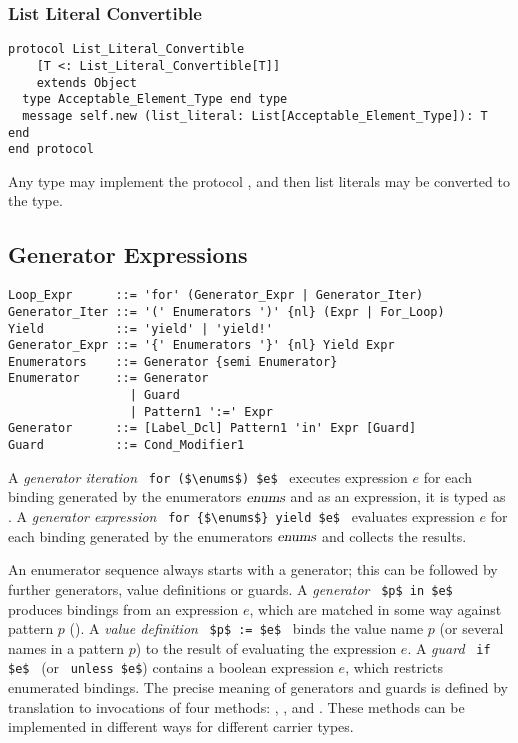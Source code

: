 \subsubsection{List Literal Convertible}

\begin{lstlisting}
protocol List_Literal_Convertible 
    [T <: List_Literal_Convertible[T]] 
    extends Object
  type Acceptable_Element_Type end type
  message self.new (list_literal: List[Acceptable_Element_Type]): T end
end protocol
\end{lstlisting}

Any type may implement the protocol , and then list literals may be converted to the type. 





\subsection{Generator Expressions}
\label{sec:generator-expressions}

\syntax\begin{lstlisting}
Loop_Expr      ::= 'for' (Generator_Expr | Generator_Iter)
Generator_Iter ::= '(' Enumerators ')' {nl} (Expr | For_Loop)
Yield          ::= 'yield' | 'yield!'
Generator_Expr ::= '{' Enumerators '}' {nl} Yield Expr
Enumerators    ::= Generator {semi Enumerator}
Enumerator     ::= Generator
                 | Guard
                 | Pattern1 ':=' Expr
Generator      ::= [Label_Dcl] Pattern1 'in' Expr [Guard]
Guard          ::= Cond_Modifier1
\end{lstlisting}

A {\em generator iteration} ~\lstinline!for ($\enums$) $e$!~ executes expression $e$ for each binding generated by the enumerators $\mbox{\sl enums}$ and as an expression, it is typed as . A {\em generator expression} ~\lstinline!for {$\enums$} yield $e$!~ evaluates expression $e$ for each binding generated by the enumerators $\mbox{\sl enums}$ and collects the results.

An enumerator sequence always starts with a generator; this can be followed by further generators, value definitions or guards. A {\em generator} ~\lstinline!$p$ in $e$!~ produces bindings from an expression $e$, which are matched in some way against pattern $p$ (). A {\em value definition} ~\lstinline!$p$ := $e$!~ binds the value name $p$ (or several names in a pattern $p$) to the result of evaluating the expression $e$. A {\em guard} ~\lstinline!if $e$!~ (or ~\lstinline!unless $e$!) contains a boolean expression $e$, which restricts enumerated bindings. The precise meaning of generators and guards is defined by translation to invocations of four methods: , ,  and . These methods can be implemented in different ways for different carrier types.

